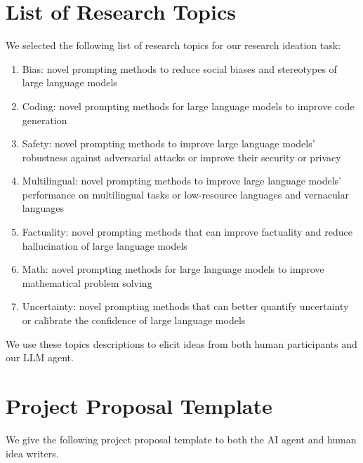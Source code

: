 \section{List of Research Topics}
\label{sec:topics}

We selected the following list of research topics for our research ideation task:

\begin{enumerate}
    \item Bias: novel prompting methods to reduce social biases and stereotypes of large language models

    \item Coding: novel prompting methods for large language models to improve code generation

    \item Safety: novel prompting methods to improve large language models’ robustness against adversarial attacks or improve their security or privacy

    \item Multilingual: novel prompting methods to improve large language models’ performance on multilingual tasks or low-resource languages and vernacular languages

    \item Factuality: novel prompting methods that can improve factuality and reduce hallucination of large language models

    \item Math: novel prompting methods for large language models to improve mathematical problem solving

    \item Uncertainty: novel prompting methods that can better quantify uncertainty or calibrate the confidence of large language models
\end{enumerate}

We use these topics descriptions to elicit ideas from both human participants and our LLM agent. 


\newpage








\section{Project Proposal Template}
\label{sec:project_proposal_template}

We give the following project proposal template to both the AI agent and human idea writers.


